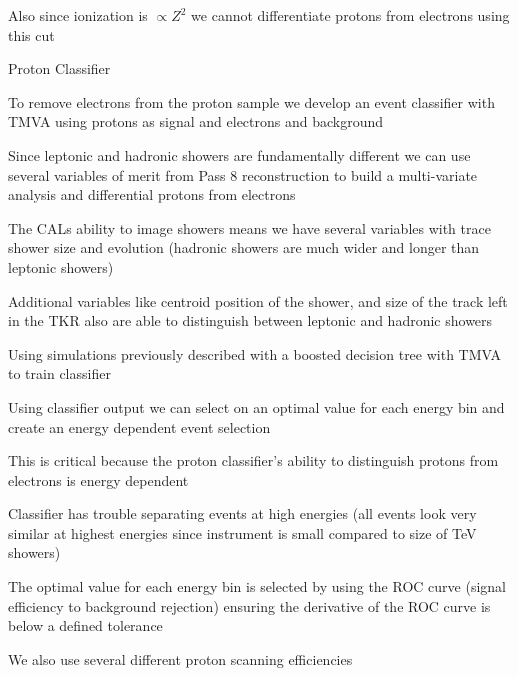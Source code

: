 \documentclass{article}
\begin{document}
\begin{myEnumerate}
\begin{myEnumerate}
\begin{myEnumerate}
					\item Also since ionization is $\propto Z^2$ we cannot differentiate protons from electrons using this cut
				\end{myEnumerate}
				\item Proton Classifier
				\begin{myEnumerate}
					\item To remove electrons from the proton sample we develop an event classifier with TMVA using protons as signal and electrons and background
					\item Since leptonic and hadronic showers are fundamentally different we can use several variables of merit from Pass 8 reconstruction to build a multi-variate analysis and differential protons from electrons
					\begin{myEnumerate}
						\item The CALs ability to image showers means we have several variables with trace shower size and evolution (hadronic showers are much wider and longer than leptonic showers)
						\item Additional variables like centroid position of the shower, and size of the track left in the TKR also are able to distinguish between leptonic and hadronic showers
					\end{myEnumerate}
					\item Using simulations previously described with a boosted decision tree with TMVA to train classifier
					\item Using classifier output we can select on an optimal value for each energy bin and create an energy dependent event selection
					\begin{myEnumerate}
						\item This is critical because the proton classifier's ability to distinguish protons from electrons is energy dependent
						\item Classifier has trouble separating events at high energies (all events look very similar at highest energies since instrument is small compared to size of TeV showers)
					\end{myEnumerate}
					\item The optimal value for each energy bin is selected by using the ROC curve (signal efficiency to background rejection) ensuring the derivative of the ROC curve is below a defined tolerance
					\item We also use several different proton scanning efficiencies
					\begin{myEnumerate}

\end{myEnumerate}
\end{myEnumerate}
\end{myEnumerate}
\end{myEnumerate}
\end{document}

